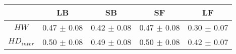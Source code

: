 \begin{tabular}{c c c c c }
\hline
 & LB & SB & SF & LF \\
\hline
$HW$ & 0.47 $\pm$ 0.08 & 0.42 $\pm$ 0.08 & 0.47 $\pm$ 0.08 & 0.30 $\pm$ 0.07 \\
$HD_{inter}$ & 0.50 $\pm$ 0.08 & 0.49 $\pm$ 0.08 & 0.50 $\pm$ 0.08 & 0.42 $\pm$ 0.07 \\
\hline
\end{tabular}